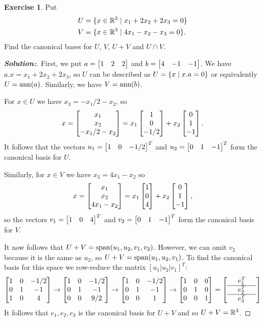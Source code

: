 \documentclass[a4paper]{amsart}
\theoremstyle{definition}
\newtheorem{exercise}{Exercise}
\newenvironment{solution}{\begin{proof}[\textbf{Solution:}] \vphantom{u}}{\end{proof}}
\begin{document}
\begin{exercise}\label{ex-plus-cap-ii}
 Put 
 \begin{align*}
  U &= \{x\in{\mathbb{R}}^3 \;|\; x_1+2x_2+2x_3 = 0 \} \\
  V &= \{x\in{\mathbb{R}}^3 \;|\; 4x_1-x_2-x_3 = 0 \}.
 \end{align*}
 Find the canonical bases for $U$, $V$, $U+V$ and $U\cap V$.  
\end{exercise}
\begin{solution}
 First, we put $a=\left[\begin{matrix} 1&2&2\end{matrix}\right]$ and $b=\left[\begin{matrix} 4&-1&-1\end{matrix}\right]$.  We have
 $a.x=x_1+2x_2+2x_3$, so $U$ can be described as $U=\{x\;|\; x.a=0\}$ or
 equivalently $U=\operatorname{ann}(a)$.  Similarly, we have $V=\operatorname{ann}(b)$.  

 For $x\in U$ we have $x_3=-x_1/2-x_2$, so 
 \[ x = \left[\begin{matrix} x_1 \\ x_2 \\ -x_1/2-x_2 \end{matrix}\right] 
      = x_1\left[\begin{matrix} 1\\0\\-1/2\end{matrix}\right] + x_2 \left[\begin{matrix} 0\\ 1\\ -1\end{matrix}\right].
 \]
 It follows that the vectors $u_1=\left[\begin{matrix} 1&0&-1/2\end{matrix}\right]^T$ and
 $u_2=\left[\begin{matrix} 0&1&-1\end{matrix}\right]^T$ form the canonical basis for $U$.

 Similarly, for $x\in V$ we have $x_3=4x_1-x_2$ so 
 \[ x = \left[\begin{matrix} x_1 \\ x_2 \\ 4x_1-x_2 \end{matrix}\right]
      = x_1 \left[\begin{matrix} 1 \\ 0 \\ 4 \end{matrix}\right] + x_2 \left[\begin{matrix} 0 \\ 1 \\ -1 \end{matrix}\right],
 \]
 so the vectors $v_1=\left[\begin{matrix} 1&0&4\end{matrix}\right]^T$ and $v_2=\left[\begin{matrix} 0&1&-1\end{matrix}\right]^T$
 form the canonical basis for $V$.

 It now follows that $U+V=\operatorname{span}(u_1,u_2,v_1,v_2)$.  However, we can
 omit $v_2$ because it is the same as $u_2$, so
 $U+V=\operatorname{span}(u_1,u_2,v_1)$.  To find the canonical basis for this space
 we row-reduce the matrix $[u_1|u_2|v_1]^T$:
 \[
   \left[\begin{matrix} 
    1 & 0 & -1/2 \\
    0 & 1 & -1 \\
    1 & 0 & 4 
   \end{matrix}\right]
   \to 
   \left[\begin{matrix} 
    1 & 0 & -1/2 \\
    0 & 1 & -1 \\
    0 & 0 & 9/2 
   \end{matrix}\right]
   \to 
   \left[\begin{matrix} 
    1 & 0 & -1/2 \\
    0 & 1 & -1 \\
    0 & 0 &  1 
   \end{matrix}\right]
   \to 
   \left[\begin{matrix} 
    1 & 0 &  0 \\
    0 & 1 &  0 \\
    0 & 0 &  1 
   \end{matrix}\right]
   = 
   \left[\begin{array}{ccc}
    & e_1^T & \\ \hline
    & e_2^T & \\ \hline
    & e_3^T & 
   \end{array}\right]
 \]
 It follows that $e_1,e_2,e_3$ is the canonical basis for $U+V$ and so
 $U+V={\mathbb{R}}^3$.  


\end{solution}
\end{document}
